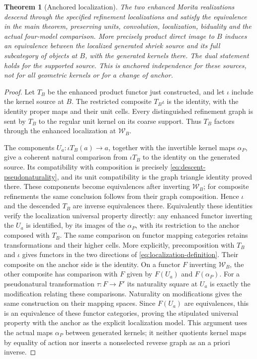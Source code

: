 \documentclass[11pt]{article}
\newtheorem{theorem}[proposition]{Theorem}
\theoremstyle{definition}
\theoremstyle{remark}
\begin{document}
\begin{theorem}[Anchored localization]\label{thm:anchored-localization}
The two enhanced Morita realizations descend through the specified
refinement localizations and satisfy the equivalence in the main
theorem, preserving units, convolution, localization, biduality and
the actual four-model comparison.  More precisely product direct image
to $B$ induces an equivalence between the localized generated shriek
source and its full subcategory of objects at $B$, with the generated
kernels there.  The dual statement holds for the supported source.
This is anchored independence for these sources, not for all
geometric kernels or for a change of anchor.
\end{theorem}
\begin{proof}
Let $T_B$ be the enhanced product functor just constructed, and let
$\iota$ include the kernel source at $B$.  The restricted composite
$T_B\iota$ is the identity, with the identity proper maps and their
unit cells.  Every distinguished refinement graph is sent by $T_B$
to the regular unit kernel on its coarse support.  Thus $T_B$ factors
through the enhanced localization at $\mathcal W_B$.

The components $U_a:\iota T_B(a)\to a$, together with the invertible
kernel maps $\alpha_P$, give a coherent natural comparison from
$\iota T_B$ to the identity on the generated source.  Its compatibility
with composition is precisely
\eqref{eq:descent-pseudonaturality}, and its unit compatibility is the
graph triangle identity proved there.
These components become equivalences after inverting
$\mathcal W_B$; for composite refinements the same conclusion follows
from their graph composition.  Hence $\iota$ and the descended $T_B$
are inverse equivalences there.  Equivalently these identities verify
the localization universal property directly: any enhanced functor
inverting the $U_a$ is identified, by its images of the $\alpha_P$,
with its restriction to the anchor composed with $T_B$.  The same
comparison on functor mapping categories retains transformations and
their higher cells.  More explicitly, precomposition with $T_B$ and
$\iota$ gives functors in the two directions of
\eqref{eq:localization-definition}.  Their composite on the anchor
side is the identity.  On a functor $F$ inverting $\mathcal W_B$,
the other composite has comparison with $F$ given by $F(U_a)$
and $F(\alpha_P)$.  For a pseudonatural transformation $\tau:F\to F'$
its naturality square at $U_a$ is exactly the modification relating
these comparisons.  Naturality on modifications gives the same
construction on their mapping spaces.  Since $F(U_a)$ are
equivalences, this is an equivalence of these functor categories,
proving the stipulated universal property with the anchor as the
explicit localization model.  This argument uses the actual maps
$\alpha_P$ between generated kernels; it neither quotients kernel
maps by equality of action nor inserts a nonselected reverse graph
as an a priori inverse.


\end{proof}
\end{document}
